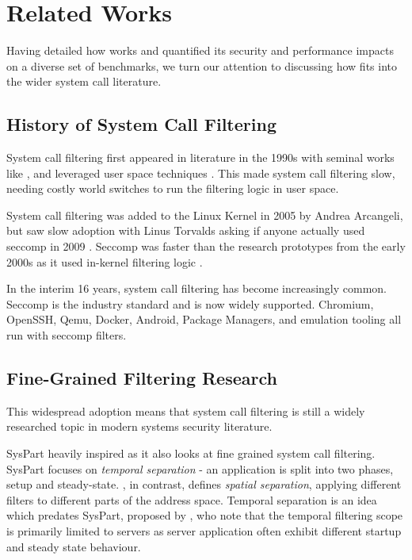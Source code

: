 \section{Related Works}\label{sec:related-works}

Having detailed how \af works and quantified its security and performance
impacts on a diverse set of benchmarks, we turn our attention to discussing how
\af fits into the wider system call literature.

\subsection{History of System Call Filtering}

System call filtering first appeared in literature in the 1990s with seminal
works like \textcite{wagner1999janus}, and leveraged
user space techniques \cite{somayaji2000automated, garfinkel2004ostia}. This made
system call filtering slow, needing costly world switches to run the filtering
logic in user space.

System call filtering was added to the Linux Kernel in 2005 by Andrea Arcangeli, but
saw slow adoption with Linus Torvalds asking if anyone actually used seccomp in
2009 \cite{arcangeli_seccomp_2005, TORVALDS_ANYONE_USES_SECCOMP}. Seccomp was
faster than the research prototypes from the early 2000s as it used in-kernel
filtering logic \cite{jia2023programmablesecurityebpf}.

In the interim 16 years, system call filtering has become increasingly common.
Seccomp is the industry standard and is now widely supported. Chromium, OpenSSH,
Qemu, Docker, Android, Package Managers, and emulation tooling all run with
seccomp filters.

\subsection{Fine-Grained Filtering Research}

This widespread adoption means that system call filtering is still a widely
researched topic in modern systems security literature. 

SysPart \cite{SYSPART} heavily inspired \af as it also
looks at fine grained system call filtering. SysPart focuses on \textit{temporal
separation} - an application is split into two phases, setup and steady-state.
\af, in contrast, defines \textit {spatial separation}, applying different
filters to different parts of the address space. Temporal separation is an
idea which predates SysPart, proposed by \textcite{TEMPORAL_SPEC}, who note that
the temporal filtering scope is primarily limited to servers as server
application often exhibit different startup and steady state behaviour. 


